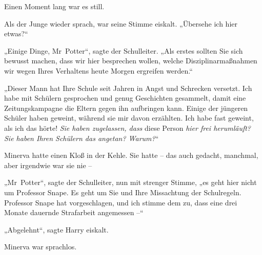 Einen Moment lang war es still.

Als der Junge wieder sprach, war seine Stimme eiskalt. „Übersehe ich hier etwas?“

„Einige Dinge, Mr~Potter“, sagte der Schulleiter. „Als erstes sollten Sie sich bewusst machen, dass wir hier besprechen wollen, welche Disziplinarmaßnahmen wir wegen Ihres Verhaltens heute Morgen ergreifen werden.“

„Dieser Mann hat Ihre Schule seit Jahren in Angst und Schrecken versetzt. Ich habe mit Schülern gesprochen und genug Geschichten gesammelt, damit eine Zeitungskampagne die Eltern gegen ihn aufbringen kann. Einige der jüngeren Schüler haben geweint, während sie mir davon erzählten. Ich habe fast geweint, als ich das hörte! \emph{Sie haben zugelassen, dass} diese Person \emph{hier frei herumläuft? Sie haben Ihren Schülern das angetan? Warum?}“

Minerva hatte einen Kloß in der Kehle. Sie hatte – das auch gedacht, manchmal, aber irgendwie war sie nie –

„Mr~Potter“, sagte der Schulleiter, nun mit strenger Stimme, „es geht hier nicht um Professor Snape. Es geht um Sie und Ihre Missachtung der Schulregeln. Professor Snape hat vorgeschlagen, und ich stimme dem zu, dass eine drei Monate dauernde Strafarbeit angemessen –“

„Abgelehnt“, sagte Harry eiskalt.

Minerva war sprachlos.

